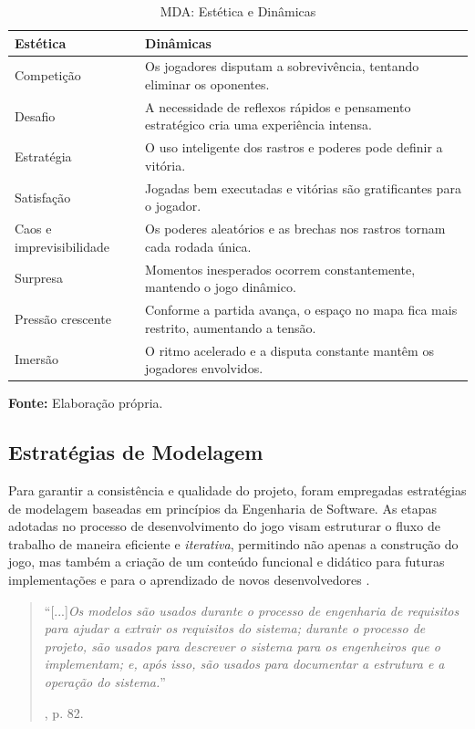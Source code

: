 \begin{table}[H]
\centering
\caption{MDA: Estética e Dinâmicas}
\label{tab:mda-estetica-dinamica}
\begin{tabularx}{\textwidth}{|>{\raggedright\arraybackslash}X|>{\raggedright\arraybackslash}X|}
\hline
\textbf{Estética} & \textbf{Dinâmicas} \\
\hline
Competição & Os jogadores disputam a sobrevivência, tentando eliminar os oponentes. \\
\hline
Desafio & A necessidade de reflexos rápidos e pensamento estratégico cria uma experiência intensa. \\
\hline
Estratégia & O uso inteligente dos rastros e poderes pode definir a vitória. \\
\hline
Satisfação & Jogadas bem executadas e vitórias são gratificantes para o jogador. \\
\hline
Caos e imprevisibilidade & Os poderes aleatórios e as brechas nos rastros tornam cada rodada única. \\
\hline
Surpresa & Momentos inesperados ocorrem constantemente, mantendo o jogo dinâmico. \\
\hline
Pressão crescente & Conforme a partida avança, o espaço no mapa fica mais restrito, aumentando a tensão. \\
\hline
Imersão & O ritmo acelerado e a disputa constante mantêm os jogadores envolvidos. \\
\hline
\end{tabularx}

\smallskip
\small \textbf{Fonte:} Elaboração própria.
\end{table}

\subsection{Estratégias de Modelagem}

Para garantir a consistência e qualidade do projeto, foram empregadas estratégias de modelagem baseadas em princípios da Engenharia de Software. As etapas adotadas no processo de desenvolvimento do jogo visam estruturar o fluxo de trabalho de maneira eficiente e \textit{iterativa}, permitindo não apenas a construção do jogo, mas também a criação de um conteúdo funcional e didático para futuras implementações e para o aprendizado de novos desenvolvedores \cite{sommerville2011}.

\begin{flushright}
\begin{minipage}{0.85\textwidth}
\begin{quote}
``[...]\textit{Os modelos são usados durante o processo de engenharia de requisitos para ajudar a extrair os requisitos do sistema; durante o processo de projeto, são usados para descrever o sistema para os engenheiros que o implementam; e, após isso, são usados para documentar a estrutura e a operação do sistema.}''

\cite{sommerville2011}, p. 82.
\end{quote}
\end{minipage}
\end{flushright}

